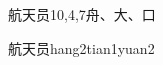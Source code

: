 \begin{entry}{航天员}{10,4,7}{⾈、⼤、⼝}
  \begin{phonetics}{航天员}{hang2tian1yuan2}
  \end{phonetics}
\end{entry}
